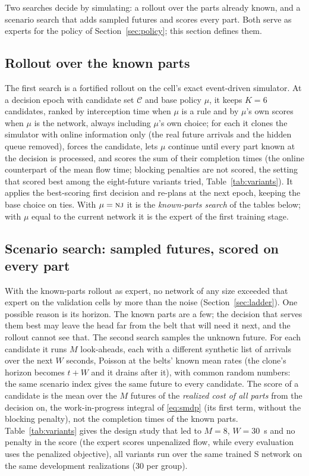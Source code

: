 \documentclass[11pt,a4paper]{article}
\theoremstyle{plain}
\theoremstyle{definition}
\theoremstyle{remark}
\newcommand{\nj}{\textsc{nj}}
\begin{document}
Two searches decide by simulating: a rollout over the parts already known, and a scenario search that adds sampled futures and scores every part. Both serve as experts for the policy of Section~\ref{sec:policy}; this section defines them.

\subsection{Rollout over the known parts}
The first search is a fortified rollout \cite{M02_Bertsekas1997} on the cell's exact
event-driven simulator. At a decision epoch with candidate set $\mathcal C$ and base policy
$\mu$, it keeps $K=6$ candidates, ranked by interception time when $\mu$ is a rule and
by $\mu$'s own scores when $\mu$ is the network, always
including $\mu$'s own choice; for each it clones the simulator with online information
only (the real future arrivals and the hidden queue removed), forces the candidate, lets
$\mu$ continue until every part known at the decision is processed, and scores the sum of
their completion times (the online counterpart of the mean flow time; blocking penalties
are not scored, the setting that scored best among the eight-future variants tried,
Table~\ref{tab:variants}). It applies the best-scoring
first decision and re-plans at the next epoch, keeping the base choice on ties. With
$\mu=\nj$ it is the \emph{known-parts search} of the tables below; with $\mu$ equal to the
current network it is the expert of the first training stage.

\subsection{Scenario search: sampled futures, scored on every part}
With the known-parts rollout as expert, no network of any size exceeded that expert on the
validation cells by more than the noise (Section~\ref{sec:ladder}). One possible reason is
its horizon.
The known parts are a few; the decision that serves them best may leave the head far from
the belt that will need it next, and the rollout cannot see that. The second search
samples the unknown future. For each candidate it runs $M$ look-aheads, each with a
different synthetic list of arrivals over the next $W$ seconds, Poisson at the belts'
known mean rates (the clone's horizon becomes $t+W$ and it drains after it), with common
random numbers: the same scenario index gives the same future to every candidate. The
score of a candidate is the mean over the $M$ futures of the \emph{realized cost of all
parts} from the decision on, the work-in-progress integral of \eqref{eq:smdp} (its first
term, without the blocking penalty), not the
completion times of the known parts. Table~\ref{tab:variants} gives the design study that
led to $M=8$, $W=30$~s and no penalty in the score (the expert scores unpenalized flow,
while every evaluation uses the penalized objective), all variants run over the same trained
S network on the same development realizations (30 per group).
\end{document}
